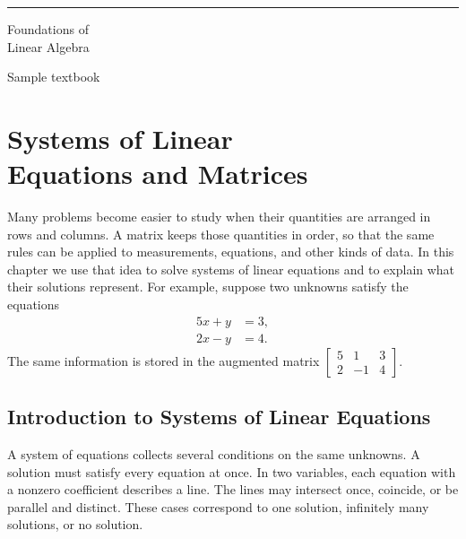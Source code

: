\documentclass[11pt,letterpaper,oneside,openany]{textbookchapter}
\begin{document}
\frontmatter
\hypersetup{pageanchor=false}
\begin{titlepage}
  \vspace*{.19\textheight}
  \noindent\textcolor{ChapterAccent}{\rule{34bp}{5bp}}\par
  \vspace{17bp}
  {\sffamily\raggedright\fontsize{36bp}{42bp}\selectfont
   \noindent Foundations of\\Linear Algebra\par}
  \vspace{18bp}
  {\sffamily\large\noindent Sample textbook\par}
\end{titlepage}
\hypersetup{pageanchor=true}
\tableofcontents

\mainmatter

\chapter[Systems of Linear Equations and Matrices]{Systems of Linear\\Equations and Matrices}
\label{ch:systems}
\chaptercontents

\begin{chapterintroduction}
Many problems become easier to study when their quantities are arranged in rows
and columns. A matrix keeps those quantities in order, so that the same rules
can be applied to measurements, equations, and other kinds of data. In this
chapter we use that idea to solve systems of linear equations and to explain
what their solutions represent. For example, suppose two unknowns satisfy the
equations
\[
  \begin{aligned}
    5x+y &= 3,\\
    2x-y &= 4.
  \end{aligned}
\]
The same information is stored in the augmented matrix
\(\left[\begin{smallmatrix}5&1&3\\2&-1&4\end{smallmatrix}\right]\).
\end{chapterintroduction}

\clearpage

\section{Introduction to Systems of Linear Equations}
\label{sec:systems}
A system of equations collects several conditions on the same unknowns. A
solution must satisfy every equation at once. In two variables, each equation
with a nonzero coefficient describes a line. The lines may intersect once,
coincide, or be parallel and distinct. These cases correspond to one solution,
infinitely many solutions, or no solution.
\end{document}

